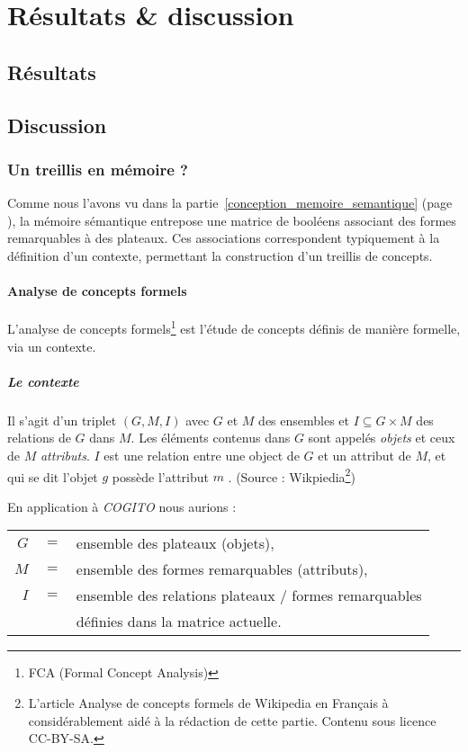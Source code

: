 \clearemptydoublepage
\chapter{Résultats \&  discussion}

\section{Résultats}



\section{Discussion}
\subsection{Un treillis en mémoire ?}
Comme nous l'avons vu dans la partie~\ref{conception_memoire_semantique} (page \pageref{conception_memoire_semantique}), la mémoire sémantique entrepose une matrice de booléens associant des formes remarquables à des plateaux. Ces associations correspondent typiquement à la définition d'un contexte, permettant la construction d'un treillis de concepts.

\subsubsection{Analyse de concepts formels}
L'analyse de concepts formels\footnote{FCA (Formal Concept Analysis)} est l'étude de concepts définis de manière formelle, via un contexte.

\paragraph{Le contexte} Il s'agit d'un triplet $(G,M,I)$ avec $G$ et $M$ des ensembles et $I\subseteq G \times M$ des relations de $G$ dans $M$. Les éléments contenus dans $G$ sont appelés \emph{objets} et ceux de $M$ \emph{attributs}. $I$ est une relation entre une object de $G$ et un attribut de $M$, et qui se dit \og l'objet $g$ possède l'attribut $m$ \fg{}. (Source : Wikpiedia\footnote{L'article \og Analyse de concepts formels \fg{} de Wikipedia en Français à considérablement aidé à la rédaction de cette partie. Contenu sous licence CC-BY-SA.})

En application à \emph{COGITO} nous aurions :

\begin{tabular}{r c l}
$G$ & $ = $ & ensemble des plateaux (objets),\\
$M$ & $ = $ & ensemble des formes remarquables (attributs),\\
$I$ & $ = $ & ensemble des relations plateaux / formes remarquables\\
& & définies dans la matrice actuelle.\\
\end{tabular}


